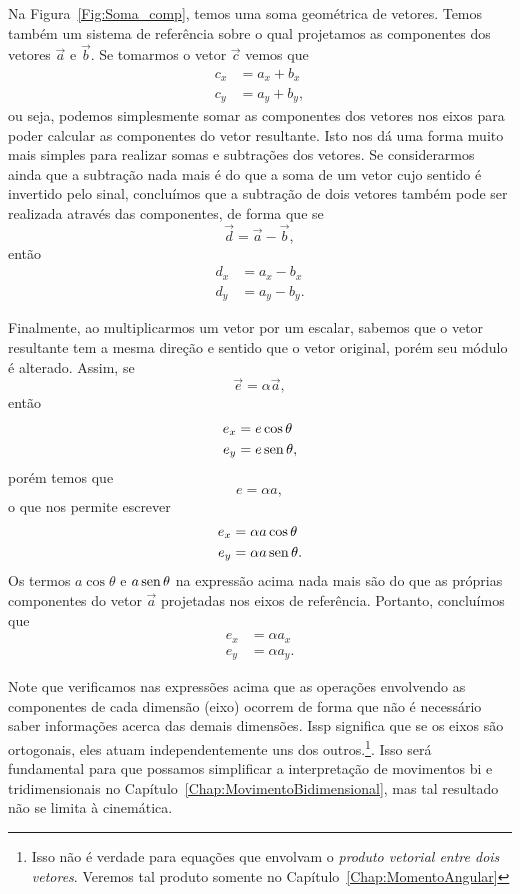 Na Figura~\ref{Fig:Soma_comp}, temos uma soma geométrica de vetores. Temos também um sistema de referência sobre o qual projetamos as componentes dos vetores $\vec{a}$ e $\vec{b}$. Se tomarmos o vetor $\vec{c}$ vemos que
\begin{align}
  c_x &= a_x + b_x \\
  c_y &= a_y + b_y,
\end{align}
%
ou seja, podemos simplesmente somar as componentes dos vetores nos eixos para poder calcular as componentes do vetor resultante. Isto nos dá uma forma muito mais simples para realizar somas e subtrações dos vetores. Se considerarmos ainda que a subtração nada mais é do que a soma de um vetor cujo sentido é invertido pelo sinal, concluímos que a subtração de dois vetores também pode ser realizada através das componentes, de forma que se
\begin{equation}
    \vec{d} = \vec{a} - \vec{b},
\end{equation}
%
então
\begin{align}
    d_x &= a_x - b_x \\
    d_y &= a_y - b_y.
\end{align}

Finalmente, ao multiplicarmos um vetor por um escalar, sabemos que o vetor resultante tem a mesma direção e sentido que o vetor original, porém seu módulo é alterado. Assim, se
\begin{equation}
    \vec{e} = \alpha \vec{a},
\end{equation}
%
então
\begin{align}
    e_x &= e \cos\theta \\
    e_y &= e \operatorname{sen}\theta,
\end{align}
%
porém temos que
\begin{equation}
    e = \alpha a,
\end{equation}
%
o que nos permite escrever
\begin{align}
    e_x &= \alpha a \cos\theta \\
    e_y &= \alpha a \operatorname{sen}\theta.
\end{align}
%
Os termos $a\cos\theta$ e $a\operatorname{sen}\theta$ na expressão acima nada mais são do que as próprias componentes do vetor $\vec{a}$ projetadas nos eixos de referência. Portanto, concluímos que
\begin{align}
    e_x &= \alpha a_x \\
    e_y &= \alpha a_y.
\end{align}

Note que verificamos nas expressões acima que as operações envolvendo as componentes de cada dimensão (eixo) ocorrem de forma que não é necessário saber informações acerca das demais dimensões. Issp significa que se os eixos são ortogonais, eles atuam independentemente uns dos outros.\footnote{Isso não é verdade para equações que envolvam o \emph{produto vetorial entre dois vetores}. Veremos tal produto somente no Capítulo~\ref{Chap:MomentoAngular}}. Isso será fundamental para que possamos simplificar a interpretação de movimentos bi e tridimensionais no Capítulo~\ref{Chap:MovimentoBidimensional}, mas tal resultado não se limita à cinemática.

